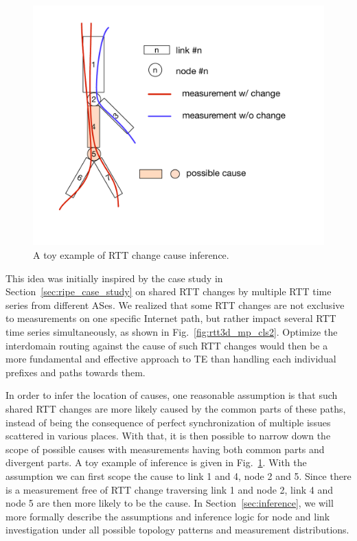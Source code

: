 \begin{figure}[!htb]
\centering
\includegraphics[width=.75\textwidth]{gfx/chap5/toy_inference.pdf}
\caption{A toy example of RTT change cause inference.}
\label{fig:chap5_toy_inference}
\end{figure}

This idea was initially inspired by the case study in Section~\ref{sec:ripe_case_study} on shared RTT changes by multiple RTT time series from different ASes. 
We realized that some RTT changes are not exclusive to measurements on one specific Internet path, but rather impact several RTT time series simultaneously, as shown in Fig.~\ref{fig:rtt3d_mp_cls2}.
Optimize the interdomain routing against the cause of such RTT changes would then be a more fundamental and effective approach to TE than handling each individual prefixes and paths towards them.

In order to infer the location of causes, one reasonable assumption is that such shared RTT changes are more likely caused by the common parts of these paths, instead of being the consequence of perfect synchronization of multiple issues scattered in various places.
With that, it is then possible to narrow down the scope of possible causes with measurements having both common parts and divergent parts. A toy example of inference is given in Fig.~\ref{fig:chap5_toy_inference}. With the assumption we can first scope the cause to link 1 and 4, node 2 and 5. Since there is a measurement free of RTT change traversing link 1 and node 2, link 4 and node 5 are then more likely to be the cause. In Section~\ref{sec:inference}, we will more formally describe the assumptions and inference logic for node and link investigation under all possible topology patterns and measurement distributions.

